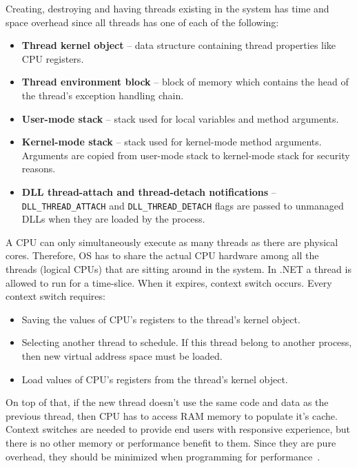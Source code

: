 Creating, destroying and having threads existing in the system has time and space overhead since all threads has one of each of the following:
\begin{itemize}
	\item \textbf{Thread kernel object} --  data structure containing thread properties like CPU registers.
	\item \textbf{Thread environment block} --  block of memory which contains the head of the thread's exception handling chain.
	\item \textbf{User-mode stack} -- stack used for local variables and method arguments.
	\item \textbf{Kernel-mode stack} -- stack used for kernel-mode method arguments. Arguments are copied from user-mode stack to kernel-mode stack for security reasons.
	\item \textbf{DLL thread-attach and thread-detach notifications} -- \texttt{DLL\_THREAD\_ATTACH} and \texttt{DLL\_THREAD\_DETACH} flags are passed to unmanaged DLLs when they are loaded by the process.
\end{itemize}

A CPU can only simultaneously execute as many threads as there are physical cores. Therefore, OS has to share the actual CPU hardware among all the threads (logical CPUs) that are sitting around in the system. In .NET a thread is allowed to run for a time-slice. When it expires, context switch occurs. Every context switch requires:
\begin{itemize}
	\item Saving the values of CPU's registers to the thread's kernel object.
	\item Selecting another thread to schedule. If this thread belong to another process, then new virtual address space must be loaded.
	\item Load values of CPU's registers from the thread's kernel object.
\end{itemize}

On top of that, if the new thread doesn't use the same code and data as the previous thread, then CPU has to access RAM memory to populate it's cache.\\

Context switches are needed to provide end users with responsive experience, but there is no other memory or performance benefit to them. Since they are pure overhead, they should be minimized when programming for performance~\cite{Richter2012Overhead}.
   
